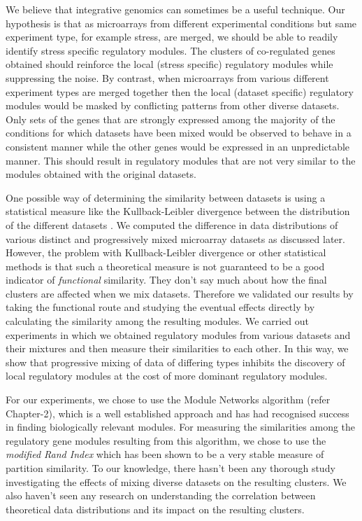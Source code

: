 We believe that integrative genomics can sometimes be a useful technique. Our hypothesis is that as microarrays from different experimental conditions but same experiment type, for example stress, are merged, we should be able to readily identify stress specific regulatory modules. The clusters of co-regulated genes obtained should reinforce the local (stress specific) regulatory modules while suppressing the noise. By contrast, when microarrays from various different experiment types are merged together then the local (dataset specific) regulatory modules would be masked by conflicting patterns from other diverse datasets. Only sets of the genes that are strongly expressed among the majority of the conditions for which datasets have been mixed would be observed to behave in a consistent manner while the other genes would be expressed in an unpredictable manner. This should result in regulatory modules that are not very similar to the modules obtained with the original datasets.

One possible way of determining the similarity between datasets is using a statistical measure like the Kullback-Leibler divergence between the distribution of the different datasets \citep{ernstwit2004statis_microarrays}. We computed the difference in data distributions of various distinct and progressively mixed microarray datasets as discussed later. However, the problem with Kullback-Leibler divergence or other statistical methods is that such a theoretical measure is not guaranteed to be a good indicator of \textit{functional} similarity. They don't say much about how the final clusters are affected when we mix datasets. Therefore we validated our results by taking the functional route and studying the eventual effects directly by calculating the similarity among the resulting modules. We carried out experiments in which we obtained regulatory modules from various datasets and their mixtures and then measure their similarities to each other. In this way, we show that progressive mixing of data of differing types inhibits the discovery of local regulatory modules at the cost of more dominant regulatory modules. 

For our experiments, we chose to use the Module Networks algorithm \citep{segal03module} (refer Chapter-2), which is a well established approach and has had recognised success in finding biologically relevant modules. For measuring the similarities among the regulatory gene modules resulting from this algorithm, we chose to use the \textit{modified Rand Index} \citep{hubert85comparing} which has been shown to be a very stable measure of partition similarity. To our knowledge, there hasn't been any thorough study investigating the effects of mixing diverse datasets on the resulting clusters. We also haven't seen any research on understanding the correlation between theoretical data distributions and its impact on the resulting clusters.

